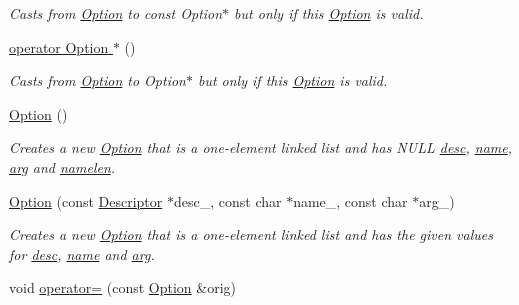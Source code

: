 \begin{DoxyCompactItemize}
\begin{DoxyCompactList}\small\item\em Casts from \hyperlink{classoption_1_1_option}{Option} to const Option$\ast$ but only if this \hyperlink{classoption_1_1_option}{Option} is valid. \end{DoxyCompactList}\item 
\hyperlink{classoption_1_1_option_ac5b9235d79208035d97e41fe17ba04d6}{operator Option $\ast$} ()
\begin{DoxyCompactList}\small\item\em Casts from \hyperlink{classoption_1_1_option}{Option} to Option$\ast$ but only if this \hyperlink{classoption_1_1_option}{Option} is valid. \end{DoxyCompactList}\item 
\mbox{\label{classoption_1_1_option_aa2810152fc23b14175b115d1a7d38095}} 
\hyperlink{classoption_1_1_option_aa2810152fc23b14175b115d1a7d38095}{Option} ()
\begin{DoxyCompactList}\small\item\em Creates a new \hyperlink{classoption_1_1_option}{Option} that is a one-\/element linked list and has N\+U\+LL \hyperlink{classoption_1_1_option_af8d664a7b5de1425008b1812a90a0c23}{desc}, \hyperlink{classoption_1_1_option_a02a76b4896abd22d0ba8514362261de9}{name}, \hyperlink{classoption_1_1_option_a402be734987458364b0f473acae36238}{arg} and \hyperlink{classoption_1_1_option_a3aa2957b19ad5815873441b415d56050}{namelen}. \end{DoxyCompactList}\item 
\hyperlink{classoption_1_1_option_a385221e2a8f37c548f0d5777bfddb216}{Option} (const \hyperlink{structoption_1_1_descriptor}{Descriptor} $\ast$desc\+\_\+, const char $\ast$name\+\_\+, const char $\ast$arg\+\_\+)
\begin{DoxyCompactList}\small\item\em Creates a new \hyperlink{classoption_1_1_option}{Option} that is a one-\/element linked list and has the given values for \hyperlink{classoption_1_1_option_af8d664a7b5de1425008b1812a90a0c23}{desc}, \hyperlink{classoption_1_1_option_a02a76b4896abd22d0ba8514362261de9}{name} and \hyperlink{classoption_1_1_option_a402be734987458364b0f473acae36238}{arg}. \end{DoxyCompactList}\item 
void \hyperlink{classoption_1_1_option_adb4b44f3778df8f28a04c48bd1b4a72b}{operator=} (const \hyperlink{classoption_1_1_option}{Option} \&orig)

\end{DoxyCompactItemize}

